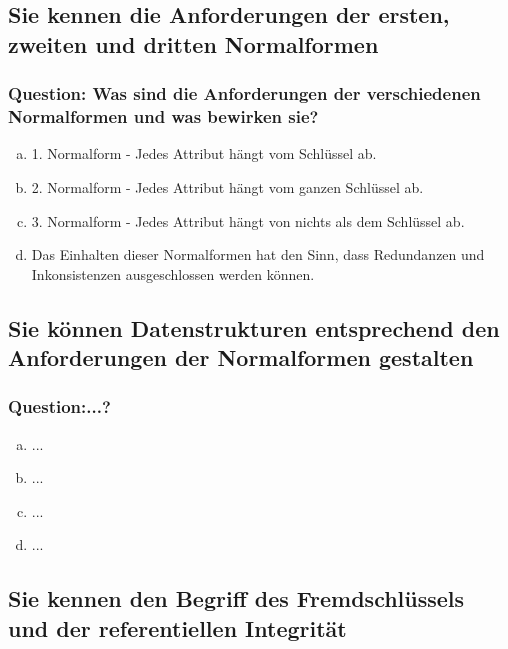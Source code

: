 \documentclass{article}
\begin{document}
\begin{adjustwidth}{2em}{2em}
\begin{adjustwidth}{2em}{2em}
			\subsection{Sie kennen die Anforderungen der ersten, zweiten und dritten Normalformen}
			\begin{adjustwidth}{1em}{}
				\subsubsection*{Question: Was sind die Anforderungen der verschiedenen Normalformen und was bewirken sie?}
				\begin{adjustwidth}{1em}{}
					\begin{enumerate}[(a)]
						\item 1. Normalform - Jedes Attribut hängt vom Schlüssel ab.
						\item 2. Normalform - Jedes Attribut hängt vom ganzen Schlüssel ab.
						\item 3. Normalform - Jedes Attribut hängt von nichts als dem Schlüssel ab.
						\item Das Einhalten dieser Normalformen hat den Sinn, dass Redundanzen und Inkonsistenzen ausgeschlossen werden können.
					\end{enumerate}
				\end{adjustwidth}
			\end{adjustwidth}
			\subsection{Sie können Datenstrukturen entsprechend den Anforderungen der Normalformen gestalten}
			\begin{adjustwidth}{1em}{}
				\subsubsection*{Question:...?}
				\begin{adjustwidth}{1em}{}
					\begin{enumerate}[(a)]						
						\item ...
						\item ...
						\item ...
						\item ...
					\end{enumerate}
				\end{adjustwidth}
			\end{adjustwidth}
			\subsection{Sie kennen den Begriff des Fremdschlüssels und der referentiellen Integrität}
			\begin{adjustwidth}{1em}{}

\end{adjustwidth}
\end{adjustwidth}
\end{adjustwidth}
\end{document}

